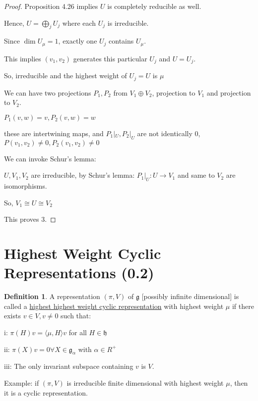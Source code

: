 \documentclass{article}
\theoremstyle{definition}
\newtheorem{definition}{Definition}
\begin{document}
\begin{proof}
    Proposition 4.26 implies \(U\) is completely reducible as well.

    Hence, \(U = \bigoplus_{j}^{} U_j\) where each \(U_j\) is irreducible.

    Since \(\dim U_\mu = 1\), exactly one \(U_j\) contains \(U_\mu\).

    This implies \((v_1, v_2)\) generates this particular \(U_j\) and \(U = U_j\).

    So, irreducible and the highest weight of \(U_j = U\) is \(\mu\) 

    We can have two projections \(P_1,P_2\) from \(V_1 \oplus V_2\), projection to \(V_1\) and projection to \(V_2\).

    \(P_1(v,w)=v, P_2(v,w)=w\) 

    these are intertwining maps, and \(P_1|_U, P_2|_U\) are not identically \(0\), \(P(v_1,v_2)\neq 0, P_2(v_1,v_2)\neq 0\) 

    We can invoke Schur's lemma:

    \(U, V_1, V_2\) are irreducible, by Schur's lemma: \(P_1|_U : U\to V_1\) and same to \(V_2\) are isomorphisms.

    So, \(V_1 \cong U \cong V_2\) 

    This proves 3.

\end{proof}

\section*{Highest Weight Cyclic Representations (0.2)}

\begin{definition}
    A representation \((\pi ,V)\) of \(\mathfrak{g}\) [possibly infinite dimensional] is called a \underline{highest highest weight cyclic representation} with highest weight \(\mu\) if there exists \(v\in V, v\neq 0\) such that:

    i: \(\pi(H)v = \langle \mu , H \rangle v\) for all \(H\in \mathfrak{h}\) 

    ii: \(\pi(X)v = 0 \forall X\in \mathfrak{g} _\alpha \) with \(\alpha \in R^+\) 

    iii: The only invariant subspace containing \(v\) is \(V\).

    Example: if \((\pi,V)\) is irreducible finite dimensional with highest weight \(\mu\), then it is a cyclic representation.

\end{definition}
\end{document}
